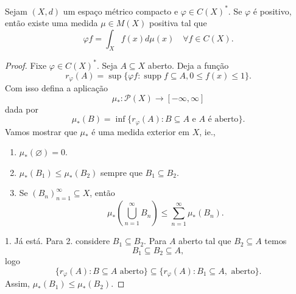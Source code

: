 \documentclass[portuguese]{article}
\theoremstyle{definition}
\begin{document}
\begin{teo}
	Sejam $(X,d)$ um espaço métrico compacto e $\varphi\in C(X)^*$. Se $\varphi$ é positivo, então existe uma medida $\mu\in M(X)$ positiva tal que
	\[\varphi f=\int_Xf(x)d\mu(x)\quad\forall f\in C(X).\]
\end{teo}
\begin{proof}
	Fixe $\varphi\in C(X)^*$. Seja $A\subseteq X$ aberto. Deja a função
	\[r_\varphi(A)=\sup\{\varphi f:\operatorname{supp}f\subseteq A, 0\leq f(x)\leq 1\}.\]
	Com isso defina a aplicação
	\[\mu_*:\mathcal{P}(X)\to [-\infty,\infty]\]
	dada por
	\[\mu_*(B)=\inf\{r_\varphi(A):B\subseteq A\text{ e }A\text{ é aberto}\}.\]
	Vamos mostrar que $\mu_*$ é uma medida exterior em $X$, ie.,
	\begin{enumerate}
		\item $\mu_*(\varnothing)=0$.
		\item $\mu_*(B_1)\leq\mu_*(B_2)$ sempre que $B_1\subseteq B_2$.
		\item Se $(B_n)_{n=1}^\infty\subseteq X$, então
		\[\mu_*\left(\bigcup_{n=1}^\infty B_n\right)\leq\sum_{n=1}^\infty\mu_*(B_n).\]
	\end{enumerate}
	1. Já está. Para 2. considere $B_1\subseteq B_2$. Para $A$ aberto tal que $B_2\subseteq A$ temos 
	\[B_1\subseteq B_2\subseteq A,\]
	logo
	\[\{r_\varphi(A):B\subseteq A\text{ aberto}\}\subseteq \{r_\varphi(A):B_1\subseteq A,\text{ aberto}\}.\]
	Assim, $\mu_*(B_1)\leq\mu_*(B_2)$.
	

\end{proof}
\end{document}
